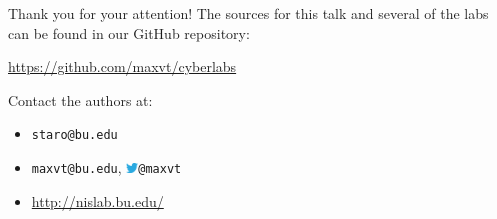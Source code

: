 \documentclass{beamer}
\begin{document}
	\begin{frame}{Thank you for your attention!}
		The sources for this talk and several of the labs can be found in our GitHub repository:
		\vfill
		\begin{center}
		\url{https://github.com/maxvt/cyberlabs}
		\end{center}
		\vfill
		Contact the authors at:
		\begin{itemize}
			\item \texttt{staro@bu.edu}
			\item \texttt{maxvt@bu.edu}, \includegraphics[width=9pt]{Twitter_bird_logo_2012.png}\hspace{0.2em}\texttt{@maxvt}
			\item \url{http://nislab.bu.edu/}
		\end{itemize}	
	\end{frame}
\end{document}
